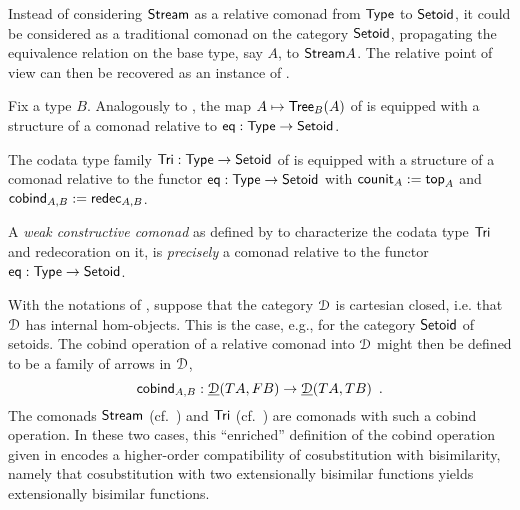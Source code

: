 \documentclass[a4paper,USenglish]{lipics}
\begin{document}
\begin{Long}
\begin{rem}
 Instead of considering $\mathsf{Stream}$ as a relative comonad from $\mathsf{Type}$ to $\mathsf{Setoid}$, it could be considered as a traditional comonad on the 
 category $\mathsf{Setoid}$, propagating the equivalence relation on the base type, say $A$, to $\mathsf{Stream} A$.
 The relative point of view can then be recovered as an instance of .
\end{rem}
\end{Long}


\begin{Long}

\begin{ex}[Trees]\label{ex_tree_comonad}
 Fix a type $B$. Analogously to , the map $A \mapsto \mathsf{Tree}_B(A)$ of 
 is equipped with a structure of a comonad relative to $\mathsf{eq}: \mathsf{Type}\to\mathsf{Setoid}$.
\end{ex}

\end{Long}

\begin{ex}\label{ex:tri_comonad}
  The codata type family $\mathsf{Tri} : \mathsf{Type} \to \mathsf{Setoid}$ of  is equipped with a structure of a comonad relative to the functor 
  $\mathsf{eq} : \mathsf{Type} \to \mathsf{Setoid}$ with
   $\mathsf{counit}_A := \mathsf{top}_A$ and
   $\mathsf{cobind}_{A,B} := \mathsf{redec}_{A,B}$.
\end{ex}

\begin{Long}
\begin{rem}
  A \emph{weak constructive comonad} as defined by \textcite{DBLP:conf/types/MatthesP11} to characterize the codata type $\mathsf{Tri}$
  and redecoration on it, is \emph{precisely}
  a comonad relative to the functor $\mathsf{eq} : \mathsf{Type}\to\mathsf{Setoid}$.
\end{rem}
\end{Long}

\begin{Long}
\begin{rem}
 With the notations of , suppose that the category $\mathcal{D}$ is cartesian closed, i.e. that $\mathcal{D}$ has
 internal hom-objects. This is the case, e.g., for the category $\mathsf{Setoid}$ of setoids.
 The cobind operation of a relative comonad into $\mathcal{D}$ might then be defined to be a family of arrows in $\mathcal{D}$,
  \begin{equation}\mathsf{cobind}_{A,B} : \underline{\mathcal{D}}(TA,FB) \to \underline{\mathcal{D}}(TA,TB) \enspace . \label{eq_enriched}\end{equation}
 The comonads $\mathsf{Stream}$ (cf.\ ) and $\mathsf{Tri}$ (cf.\ ) are comonads with such a cobind operation. In these two cases, this \enquote{enriched} definition of the cobind operation given in  encodes a higher-order 
 compatibility of cosubstitution with bisimilarity, namely that cosubstitution with two extensionally bisimilar functions
 yields extensionally bisimilar functions.
\end{rem}
\end{Long}
\end{document}
